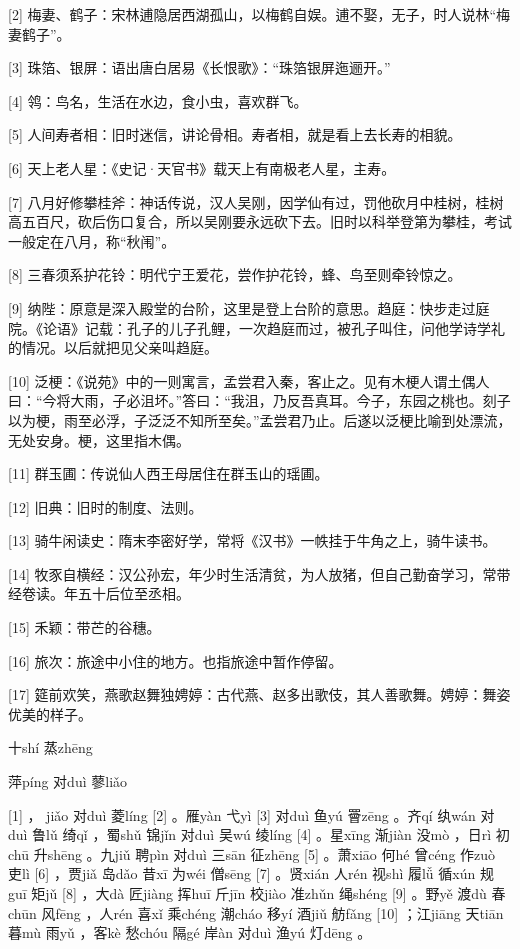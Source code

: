 \documentclass[12pt,UTF8]{ctexbook}
\begin{document}
[2] 梅妻、鹤子：宋林逋隐居西湖孤山，以梅鹤自娱。逋不娶，无子，时人说林“梅妻鹤子”。

[3] 珠箔、银屏：语出唐白居易《长恨歌》：“珠箔银屏迤逦开。”

[4] 鸰：鸟名，生活在水边，食小虫，喜欢群飞。

[5] 人间寿者相：旧时迷信，讲论骨相。寿者相，就是看上去长寿的相貌。

[6] 天上老人星：《史记·天官书》载天上有南极老人星，主寿。

[7] 八月好修攀桂斧：神话传说，汉人吴刚，因学仙有过，罚他砍月中桂树，桂树高五百尺，砍后伤口复合，所以吴刚要永远砍下去。旧时以科举登第为攀桂，考试一般定在八月，称“秋闱”。

[8] 三春须系护花铃：明代宁王爱花，尝作护花铃，蜂、鸟至则牵铃惊之。

[9] 纳陛：原意是深入殿堂的台阶，这里是登上台阶的意思。趋庭：快步走过庭院。《论语》记载：孔子的儿子孔鲤，一次趋庭而过，被孔子叫住，问他学诗学礼的情况。以后就把见父亲叫趋庭。

[10] 泛梗：《说苑》中的一则寓言，孟尝君入秦，客止之。见有木梗人谓土偶人曰：“今将大雨，子必沮坏。”答曰：“我沮，乃反吾真耳。今子，东园之桃也。刻子以为梗，雨至必浮，子泛泛不知所至矣。”孟尝君乃止。后遂以泛梗比喻到处漂流，无处安身。梗，这里指木偶。

[11] 群玉圃：传说仙人西王母居住在群玉山的瑶圃。

[12] 旧典：旧时的制度、法则。

[13] 骑牛闲读史：隋末李密好学，常将《汉书》一帙挂于牛角之上，骑牛读书。

[14] 牧豕自横经：汉公孙宏，年少时生活清贫，为人放猪，但自己勤奋学习，常带经卷读。年五十后位至丞相。

[15] 禾颖：带芒的谷穗。

[16] 旅次：旅途中小住的地方。也指旅途中暂作停留。

[17] 筵前欢笑，燕歌赵舞独娉婷：古代燕、赵多出歌伎，其人善歌舞。娉婷：舞姿优美的样子。





十shí 蒸zhēng


萍píng 对duì 蓼liǎo





[1] ， jiǎo 对duì 菱líng [2] 。雁yàn 弋yì [3] 对duì 鱼yú 罾zēng 。齐qí 纨wán 对duì 鲁lǔ 绮qǐ ，蜀shǔ 锦jǐn 对duì 吴wú 绫líng [4] 。星xīng 渐jiàn 没mò ，日rì 初chū 升shēng 。九jiǔ 聘pìn 对duì 三sān 征zhēng [5] 。萧xiāo 何hé 曾céng 作zuò 吏lì [6] ，贾jiǎ 岛dǎo 昔xī 为wéi 僧sēng [7] 。贤xián 人rén 视shì 履lǚ 循xún 规guī 矩jǔ [8] ，大dà 匠jiàng 挥huī 斤jīn 校jiào 准zhǔn 绳shéng [9] 。野yě 渡dù 春chūn 风fēng ，人rén 喜xǐ 乘chéng 潮cháo 移yí 酒jiǔ 舫fǎng [10] ；江jiāng 天tiān 暮mù 雨yǔ ，客kè 愁chóu 隔gé 岸àn 对duì 渔yú 灯dēng 。
\end{document}
